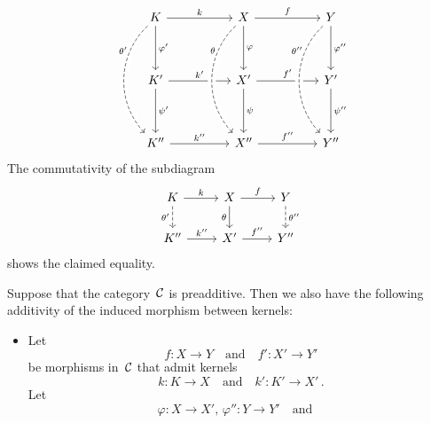 \begin{remark*}
\begin{enumerate}
\begin{itemize}
\[\begin{tikzcd}[sep = huge]
                K
                \arrow{r}[above]{k}
                \arrow{d}[right]{\varphi'}
              & X
                \arrow{r}[above]{f}
                \arrow{d}[right]{\varphi}
              & Y
                \arrow{d}[right]{\varphi''}
              \\
                K'
                \arrow{r}[above]{k'}
                \arrow{d}[right]{\psi'}
              & X'
                \arrow{r}[above]{f'}
                \arrow{d}[right]{\psi}
              & Y'
                \arrow{d}[right]{\psi''}
              \\
                K''
                \arrow{r}[above]{k''}
                \arrow[from=uu, dashed, bend right = 45, crossing over, "\theta'" left, near start]
              & X''
                \arrow{r}[above]{f''}
                \arrow[from=uu, dashed, bend right = 45, crossing over, "\theta" left, near start]
              & Y''
                \arrow[from=uu, dashed, bend right = 45, crossing over, "\theta''" left, near start]
            \end{tikzcd}
          \]
          The commutativity of the subdiagram
          \[
            \begin{tikzcd}
                K
                \arrow{r}[above]{k}
                \arrow[dashed]{d}[left]{\theta'}
              & X
                \arrow{r}[above]{f}
                \arrow{d}[left]{\theta}
              & Y
                \arrow[dashed]{d}[right]{\theta''}
              \\
                K''
                \arrow{r}[above]{k''}
              & X'
                \arrow{r}[above]{f''}
              & Y''
            \end{tikzcd}
          \]
          shows the claimed equality.
      \end{itemize}
      Suppose that the category~$\mathcal{C}$ is preadditive.
      Then we also have the following additivity of the induced morphism between kernels:
      \begin{itemize}[resume]
        \item
          Let
          \[
            f \colon X \to Y
            \quad\text{and}\quad
            f' \colon X' \to Y'
          \]
          be morphisms in~$\mathcal{C}$ that admit kernels
          \[
            k \colon K \to X
            \quad\text{and}\quad
            k' \colon K' \to X' \,.
          \]
          Let
          \[
            \varphi \colon X \to X',\,
            \varphi'' \colon Y \to Y'
            \quad\text{and}\quad
\]
\end{itemize}
\end{enumerate}
\end{remark*}
